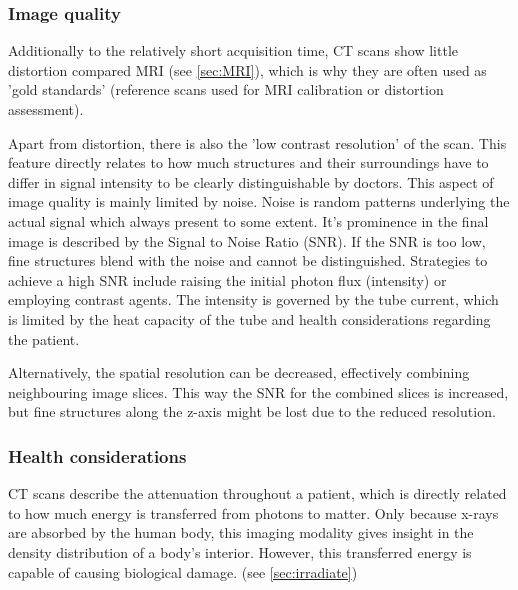 \subsubsection{Image quality} %
Additionally to the relatively short acquisition time, CT scans show little distortion compared MRI (see \ref{sec:MRI}), which is why they are often used as 'gold standards' (reference scans used for MRI calibration or distortion assessment).

Apart from distortion, there is also the 'low contrast resolution' of the scan.
This feature directly relates to how much structures and their surroundings have to differ in signal intensity to be clearly distinguishable by doctors.
This aspect of image quality is mainly limited by noise.
Noise is random patterns underlying the actual signal which always present to some extent.
It's prominence in the final image is described by the Signal to Noise Ratio (SNR).
If the SNR is too low, fine structures blend with the noise and cannot be distinguished. 
Strategies to achieve a high SNR include raising the initial photon flux (intensity) or employing contrast agents.
The intensity is governed by the tube current, which is limited by the heat capacity of the tube and health considerations regarding the patient.

Alternatively, the spatial resolution can be decreased, effectively combining neighbouring image slices.
This way the SNR for the combined slices is increased, but fine structures along the z-axis might be lost due to the reduced resolution. \cite{Podgorsak, Maidment2014}

\subsubsection{Health considerations}
CT scans describe the attenuation throughout a patient, which is directly related to how much energy is transferred from photons to matter.
Only because x-rays are absorbed by the human body, this imaging modality gives insight in the density distribution of a body's interior.
However, this transferred energy is capable of causing biological damage. (see \ref{sec:irradiate})

